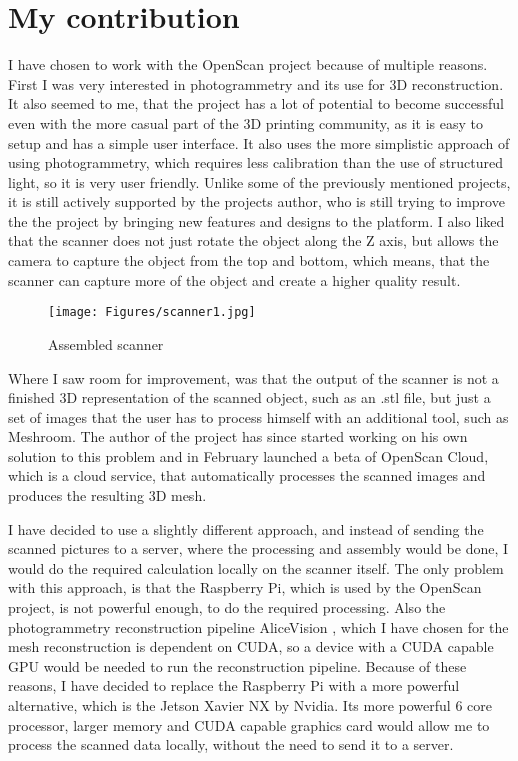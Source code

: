 \chapter{My contribution}
\label{sec:contribution}
I have chosen to work with the OpenScan project because of multiple reasons.
First I was very interested in photogrammetry and its use for 3D reconstruction.
It also seemed to me, that the project has a lot of potential to become successful even with the more casual part of the 3D printing community, as it is easy to setup and has a simple user interface.
It also uses the more simplistic approach of using photogrammetry, which requires less calibration than the use of structured light, so it is very user friendly.
Unlike some of the previously mentioned projects, it is still actively supported by the projects author, who is still trying to improve the the project by bringing new features and designs to the platform.
I also liked that the scanner does not just rotate the object along the Z axis, but allows the camera to capture the object from the top and bottom, which means, that the scanner can capture more of the object and create a higher quality result.

\begin{figure}[h!]
	\centering
	\texttt{[image: Figures/scanner1.jpg]}	
	\caption{Assembled scanner}
\end{figure}

Where I saw room for improvement, was that the output of the scanner is not a finished 3D representation of the scanned object, such as an .stl file, but just a set of images that the user has to process himself with an additional tool, such as Meshroom.
The author of the project has since started working on his own solution to this problem and in February launched a beta of OpenScan Cloud, which is a cloud service, that automatically processes the scanned images and produces the resulting 3D mesh. \cite{openscanCloud}


I have decided to use a slightly different approach, and instead of sending the scanned pictures to a server, where the processing and assembly would be done, I would do the required calculation locally on the scanner itself.
The only problem with this approach, is that the Raspberry Pi, which is used by the OpenScan project, is not powerful enough, to do the required processing.
Also the photogrammetry reconstruction pipeline AliceVision \cite{Moulon2012, Jancosek2011}, which I have chosen for the mesh reconstruction is dependent on CUDA, so a device with a CUDA capable GPU would be needed to run the reconstruction pipeline.
Because of these reasons, I have decided to replace the Raspberry Pi with a more powerful alternative, which is the Jetson Xavier NX by Nvidia.
Its more powerful 6 core processor, larger memory and CUDA capable graphics card would allow me to process the scanned data locally, without the need to send it to a server.


